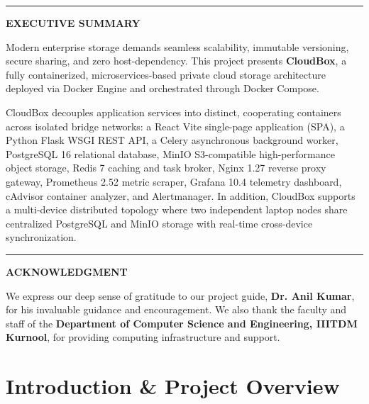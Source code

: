 \documentclass[11pt,a4paper]{report}
\begin{document}
\vspace{0.3cm}
\noindent\rule{\textwidth}{0.6pt}
\vspace{0.15cm}

\begin{center}
    {\large\bfseries\color{dockerblue} EXECUTIVE SUMMARY}
\end{center}
\vspace{0.05cm}
Modern enterprise storage demands seamless scalability, immutable versioning, secure sharing, and zero host-dependency. This project presents \textbf{CloudBox}, a fully containerized, microservices-based private cloud storage architecture deployed via Docker Engine and orchestrated through Docker Compose. 

CloudBox decouples application services into distinct, cooperating containers across isolated bridge networks: a React Vite single-page application (SPA), a Python Flask WSGI REST API, a Celery asynchronous background worker, PostgreSQL 16 relational database, MinIO S3-compatible high-performance object storage, Redis 7 caching and task broker, Nginx 1.27 reverse proxy gateway, Prometheus 2.52 metric scraper, Grafana 10.4 telemetry dashboard, cAdvisor container analyzer, and Alertmanager. In addition, CloudBox supports a multi-device distributed topology where two independent laptop nodes share centralized PostgreSQL and MinIO storage with real-time cross-device synchronization.

\vspace{0.25cm}
\noindent\rule{\textwidth}{0.6pt}
\vspace{0.15cm}

\begin{center}
    {\large\bfseries\color{iiitblue} ACKNOWLEDGMENT}
\end{center}
\vspace{0.05cm}
We express our deep sense of gratitude to our project guide, \textbf{Dr. Anil Kumar}, for his invaluable guidance and encouragement. We also thank the faculty and staff of the \textbf{Department of Computer Science and Engineering, IIITDM Kurnool}, for providing computing infrastructure and support.

\clearpage

\chapter{Introduction \& Project Overview}
\end{document}
